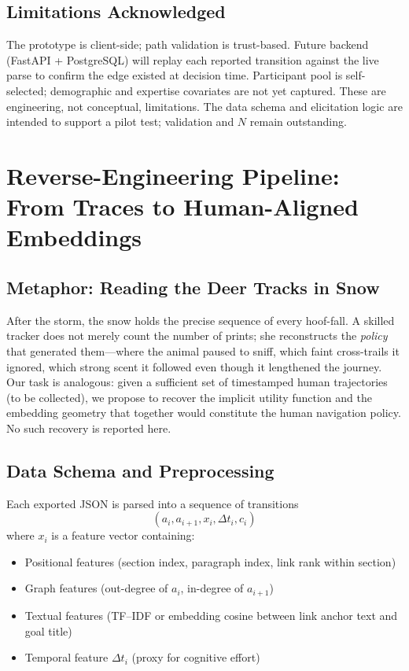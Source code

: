 \documentclass[11pt,a4paper]{report}
\begin{document}
\section{Limitations Acknowledged}

The prototype is client-side; path validation is trust-based. Future backend (FastAPI + PostgreSQL) will replay each reported transition against the live parse to confirm the edge existed at decision time. Participant pool is self-selected; demographic and expertise covariates are not yet captured. These are engineering, not conceptual, limitations. The data schema and elicitation logic are intended to support a pilot test; validation and \(N\) remain outstanding.

\chapter{Reverse-Engineering Pipeline: From Traces to Human-Aligned Embeddings}

\section{Metaphor: Reading the Deer Tracks in Snow}

After the storm, the snow holds the precise sequence of every hoof-fall. A skilled tracker does not merely count the number of prints; she reconstructs the \textit{policy} that generated them—where the animal paused to sniff, which faint cross-trails it ignored, which strong scent it followed even though it lengthened the journey. Our task is analogous: given a sufficient set of timestamped human trajectories (to be collected), we propose to recover the implicit utility function and the embedding geometry that together would constitute the human navigation policy. No such recovery is reported here.

\section{Data Schema and Preprocessing}

Each exported JSON is parsed into a sequence of transitions
\[
(a_i, a_{i+1}, x_i, \Delta t_i, c_i)
\]
where \(x_i\) is a feature vector containing:
\begin{itemize}
    \item Positional features (section index, paragraph index, link rank within section)
    \item Graph features (out-degree of \(a_i\), in-degree of \(a_{i+1}\))
    \item Textual features (TF–IDF or embedding cosine between link anchor text and goal title)
    \item Temporal feature \(\Delta t_i\) (proxy for cognitive effort)
\end{itemize}
\end{document}
